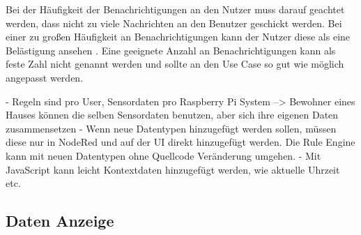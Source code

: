 Bei der Häufigkeit der Benachrichtigungen an den Nutzer muss darauf geachtet werden, dass nicht zu viele Nachrichten an den Benutzer geschickt werden. Bei einer zu großen Häufigkeit an Benachrichtigungen kann der Nutzer diese als eine Belästigung ansehen \cite{gadgets:amountnotifications}. Eine geeignete Anzahl an Benachrichtigungen kann als feste Zahl nicht genannt werden und sollte an den Use Case so gut wie möglich angepasst werden.   


- Regeln sind pro User, Sensordaten pro Raspberry Pi System --> Bewohner eines Hauses können die selben Sensordaten benutzen, aber sich ihre eigenen Daten zusammensetzen
- Wenn neue Datentypen hinzugefügt werden sollen, müssen diese nur in NodeRed und auf der UI direkt hinzugefügt werden. Die Rule Engine kann mit neuen Datentypen ohne Quellcode Veränderung umgehen.
- Mit JavaScript kann leicht Kontextdaten hinzugefügt werden, wie aktuelle Uhrzeit etc.



\subsection{Daten Anzeige}